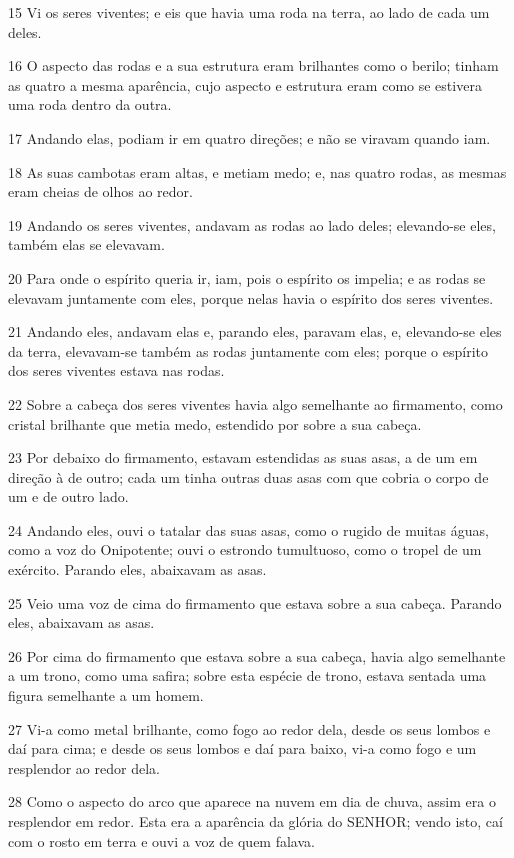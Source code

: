 \par 15 Vi os seres viventes; e eis que havia uma roda na terra, ao lado de cada um deles.
\par 16 O aspecto das rodas e a sua estrutura eram brilhantes como o berilo; tinham as quatro a mesma aparência, cujo aspecto e estrutura eram como se estivera uma roda dentro da outra.
\par 17 Andando elas, podiam ir em quatro direções; e não se viravam quando iam.
\par 18 As suas cambotas eram altas, e metiam medo; e, nas quatro rodas, as mesmas eram cheias de olhos ao redor.
\par 19 Andando os seres viventes, andavam as rodas ao lado deles; elevando-se eles, também elas se elevavam.
\par 20 Para onde o espírito queria ir, iam, pois o espírito os impelia; e as rodas se elevavam juntamente com eles, porque nelas havia o espírito dos seres viventes.
\par 21 Andando eles, andavam elas e, parando eles, paravam elas, e, elevando-se eles da terra, elevavam-se também as rodas juntamente com eles; porque o espírito dos seres viventes estava nas rodas.
\par 22 Sobre a cabeça dos seres viventes havia algo semelhante ao firmamento, como cristal brilhante que metia medo, estendido por sobre a sua cabeça.
\par 23 Por debaixo do firmamento, estavam estendidas as suas asas, a de um em direção à de outro; cada um tinha outras duas asas com que cobria o corpo de um e de outro lado.
\par 24 Andando eles, ouvi o tatalar das suas asas, como o rugido de muitas águas, como a voz do Onipotente; ouvi o estrondo tumultuoso, como o tropel de um exército. Parando eles, abaixavam as asas.
\par 25 Veio uma voz de cima do firmamento que estava sobre a sua cabeça. Parando eles, abaixavam as asas.
\par 26 Por cima do firmamento que estava sobre a sua cabeça, havia algo semelhante a um trono, como uma safira; sobre esta espécie de trono, estava sentada uma figura semelhante a um homem.
\par 27 Vi-a como metal brilhante, como fogo ao redor dela, desde os seus lombos e daí para cima; e desde os seus lombos e daí para baixo, vi-a como fogo e um resplendor ao redor dela.
\par 28 Como o aspecto do arco que aparece na nuvem em dia de chuva, assim era o resplendor em redor. Esta era a aparência da glória do SENHOR; vendo isto, caí com o rosto em terra e ouvi a voz de quem falava.

